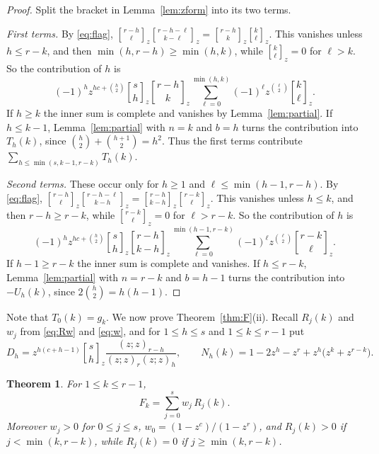 \documentclass{amsart}
\newtheorem{theorem}{Theorem}[section]
\theoremstyle{remark}
\numberwithin{equation}{section}
\newcommand{\qbinom}[3]{\genfrac{[}{]}{0pt}{}{#1}{#2}_{#3}}
\newcommand{\poch}[1]{(z;z)_{#1}}
\begin{document}
\begin{proof}
Split the bracket in Lemma~\ref{lem:zform} into its two terms.

\emph{First terms.} By \eqref{eq:flag}, $\qbinom{r-h}{\ell}{z}\qbinom{r-h-\ell}{k-\ell}{z}=\qbinom{r-h}{k}{z}\qbinom{k}{\ell}{z}$. This vanishes unless $h\le r-k$, and then $\min(h,r-h)\ge\min(h,k)$, while $\qbinom{k}{\ell}{z}=0$ for $\ell>k$. So the contribution of $h$ is
\[
  (-1)^hz^{hc+\binom h2}\qbinom{s}{h}{z}\qbinom{r-h}{k}{z}\sum_{\ell=0}^{\min(h,k)}(-1)^\ell z^{\binom\ell2}\qbinom{k}{\ell}{z}.
\]
If $h\ge k$ the inner sum is complete and vanishes by Lemma~\ref{lem:partial}. If $h\le k-1$, Lemma~\ref{lem:partial} with $n=k$ and $b=h$ turns the contribution into $T_h(k)$, since $\binom h2+\binom{h+1}2=h^2$. Thus the first terms contribute $\sum_{h\le\min(s,k-1,r-k)}T_h(k)$.

\emph{Second terms.} These occur only for $h\ge1$ and $\ell\le\min(h-1,r-h)$. By \eqref{eq:flag}, $\qbinom{r-h}{\ell}{z}\qbinom{r-h-\ell}{k-h}{z}=\qbinom{r-h}{k-h}{z}\qbinom{r-k}{\ell}{z}$. This vanishes unless $h\le k$, and then $r-h\ge r-k$, while $\qbinom{r-k}{\ell}{z}=0$ for $\ell>r-k$. So the contribution of $h$ is
\[
  (-1)^hz^{hc+\binom h2}\qbinom{s}{h}{z}\qbinom{r-h}{k-h}{z}\sum_{\ell=0}^{\min(h-1,r-k)}(-1)^\ell z^{\binom\ell2}\qbinom{r-k}{\ell}{z}.
\]
If $h-1\ge r-k$ the inner sum is complete and vanishes. If $h\le r-k$, Lemma~\ref{lem:partial} with $n=r-k$ and $b=h-1$ turns the contribution into $-U_h(k)$, since $2\binom h2=h(h-1)$.
\end{proof}

Note that $T_0(k)=g_k$. We now prove Theorem~\ref{thm:F}(ii). Recall $R_j(k)$ and $w_j$ from \eqref{eq:Rw} and \eqref{eq:w}, and for $1\le h\le s$ and $1\le k\le r-1$ put
\[
  D_h=z^{h(c+h-1)}\qbinom{s}{h}{z}\frac{\poch{r-h}}{\poch{r}\poch{h}},\qquad
  N_h(k)=1-2z^h-z^r+z^h\bigl(z^k+z^{r-k}\bigr).
\]

\begin{theorem}\label{thm:expansion}
For $1\le k\le r-1$,
\begin{equation}\label{eq:expansion}
  F_k=\sum_{j=0}^{s}w_j\,R_j(k).
\end{equation}
Moreover $w_j>0$ for $0\le j\le s$, $w_0=(1-z^c)/(1-z^r)$, and $R_j(k)>0$ if $j<\min(k,r-k)$, while $R_j(k)=0$ if $j\ge\min(k,r-k)$.
\end{theorem}
\end{document}
